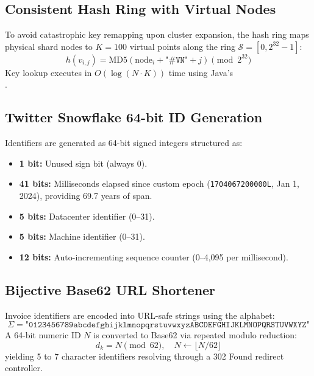 \documentclass[11pt,a4paper]{article}
\begin{document}
\subsection{Consistent Hash Ring with Virtual Nodes}
To avoid catastrophic key remapping upon cluster expansion, the hash ring maps physical shard nodes to $K = 100$ virtual points along the ring $\mathcal{S} = [0, 2^{32} - 1]$:
\begin{equation}
h(v_{i, j}) = \text{MD5}(\text{node}_i + \texttt{"\#VN"} + j) \pmod{2^{32}}
\end{equation}
Key lookup executes in $O(\log(N \cdot K))$ time using Java's\\
.

\subsection{Twitter Snowflake 64-bit ID Generation}
Identifiers are generated as 64-bit signed integers structured as:
\begin{itemize}
    \item \textbf{1 bit:} Unused sign bit (always 0).
    \item \textbf{41 bits:} Milliseconds elapsed since custom epoch (\texttt{1704067200000L}, Jan 1, 2024), providing 69.7 years of span.
    \item \textbf{5 bits:} Datacenter identifier (0--31).
    \item \textbf{5 bits:} Machine identifier (0--31).
    \item \textbf{12 bits:} Auto-incrementing sequence counter (0--4,095 per millisecond).
\end{itemize}

\subsection{Bijective Base62 URL Shortener}
Invoice identifiers are encoded into URL-safe strings using the alphabet:
\begin{equation}
\Sigma = \texttt{"0123456789abcdefghijklmnopqrstuvwxyzABCDEFGHIJKLMNOPQRSTUVWXYZ"}
\end{equation}
A 64-bit numeric ID $N$ is converted to Base62 via repeated modulo reduction:
\begin{equation}
d_k = N \pmod{62}, \quad N \gets \lfloor N / 62 \rfloor
\end{equation}
yielding 5 to 7 character identifiers resolving through a 302 Found redirect controller.
\end{document}
